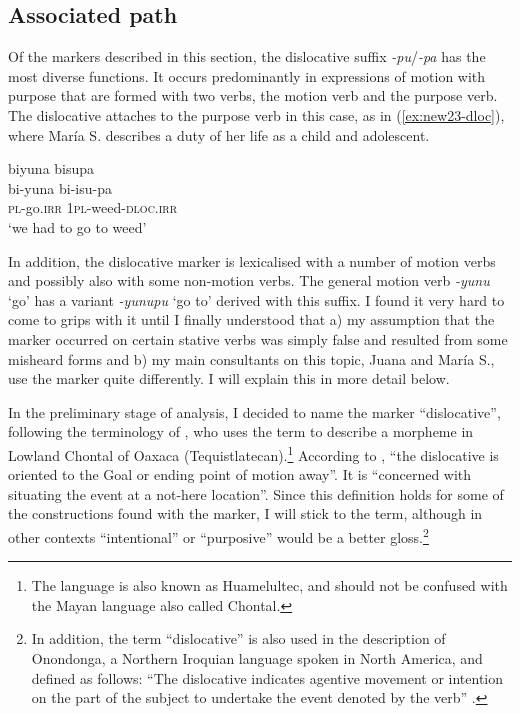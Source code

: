 \subsection{Associated path}\label{sec:PA}

Of the markers described in this section, the dislocative suffix \textit{-pu}/\textit{-pa} has the most diverse functions. It occurs predominantly in expressions of motion with purpose that are formed with two verbs, the motion verb and the purpose verb. The dislocative attaches to the purpose verb in this case, as in (\ref{ex:new23-dloc}), where María S. describes a duty of her life as a child and adolescent. 

\ea\label{ex:new23-dloc}
\begingl
\glpreamble biyuna bisupa\\
\gla bi-yuna bi-isu-pa\\
\textsc{pl}-go.\textsc{irr} 1\textsc{pl}-weed-\textsc{dloc.irr}\\
\glft ‘we had to go to weed’
\endgl
\trailingcitation{[rxx-p181101l-2.149]}
\xe
{}

In addition, the dislocative marker is lexicalised with a number of motion verbs and possibly also with some non-motion verbs. The general motion verb \textit{-yunu} ‘go’ has a variant \textit{-yunupu} ‘go to’ derived with this suffix. I found it very hard to come to grips with it until I finally understood that a) my assumption that the marker occurred on certain stative verbs was simply false and resulted from some misheard forms and b) my main consultants on this topic, Juana and María S., use the marker quite differently. I will explain this in more detail below.

In the preliminary stage of analysis, I decided to name the marker “dislocative”, following the terminology of \citet[]{OConnor2007}, who uses the term to describe a morpheme in Lowland Chontal of Oaxaca (Tequistlatecan).\footnote{The language is also known as Huamelultec, and should not be confused with the Mayan language also called Chontal.} According to \citet[112]{OConnor2007}, “the dislocative is oriented to the Goal or ending point of motion away”. It is “concerned with situating the event at a not-here location”.
Since this definition holds for some of the constructions found with the marker, I will stick to the term, although in other contexts “intentional” or “purposive” would be a better gloss.\footnote{In addition, the term “dislocative” is also used in the description of Onondonga, a Northern Iroquian language spoken in North America, and defined as follows: “The dislocative indicates agentive movement or intention on the part of the subject to undertake the event denoted by the verb” \citep[66]{Barrie2015}.}

